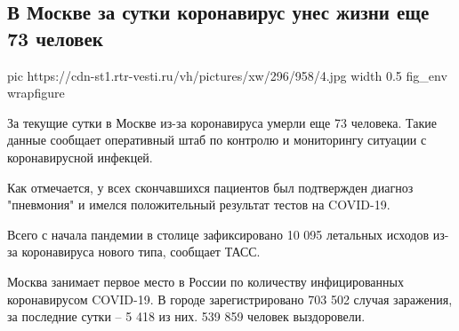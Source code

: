  
 
 
 
 
 
\subsection{В Москве за сутки коронавирус унес жизни еще 73 человек}
\label{sec:15_12_2020.news.ru.vesti.2.moskva_covid_deaths}

\ifcmt
  pic https://cdn-st1.rtr-vesti.ru/vh/pictures/xw/296/958/4.jpg
  width 0.5
  fig_env wrapfigure
\fi


За текущие сутки в Москве из-за коронавируса умерли еще 73 человека. Такие
данные сообщает оперативный штаб по контролю и мониторингу ситуации с
коронавирусной инфекцей.

Как отмечается, у всех скончавшихся пациентов был подтвержден диагноз
"пневмония" и имелся положительный результат тестов на COVID-19.

Всего с начала пандемии в столице зафиксировано 10 095 летальных исходов из-за
коронавируса нового типа, сообщает ТАСС.

Москва занимает первое место в России по количеству инфицированных
коронавирусом COVID-19. В городе зарегистрировано 703 502 случая заражения, за
последние сутки – 5 418 из них. 539 859 человек выздоровели.
